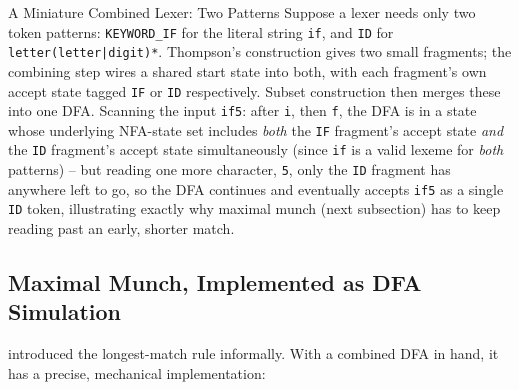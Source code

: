 \documentclass[full-course-notes.tex]{subfiles}
\begin{document}
\begin{examplebox}{A Miniature Combined Lexer: Two Patterns}
Suppose a lexer needs only two token patterns: \texttt{KEYWORD\_IF} for the literal string
\texttt{if}, and \texttt{ID} for \texttt{letter(letter|digit)*}. Thompson's construction gives
two small fragments; the combining step wires a shared start state into both, with each
fragment's own accept state tagged \texttt{IF} or \texttt{ID} respectively. Subset construction
then merges these into one DFA. Scanning the input \texttt{if5}: after \texttt{i}, then
\texttt{f}, the DFA is in a state whose underlying NFA-state set includes \emph{both} the
\texttt{IF} fragment's accept state \emph{and} the \texttt{ID} fragment's accept state
simultaneously (since \texttt{if} is a valid lexeme for \emph{both} patterns) -- but reading one
more character, \texttt{5}, only the \texttt{ID} fragment has anywhere left to go, so the DFA
continues and eventually accepts \texttt{if5} as a single \texttt{ID} token, illustrating
exactly why maximal munch (next subsection) has to keep reading past an early, shorter
match.
\end{examplebox}

\subsection{Maximal Munch, Implemented as DFA Simulation}
\label{sec:l6-lexgen-maximal-munch}

\dbtag {} introduced the longest-match rule informally. With a combined DFA
in hand, it has a precise, mechanical implementation:
\end{document}
